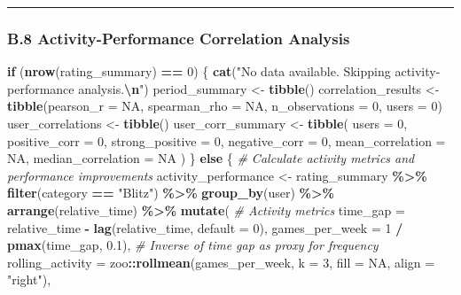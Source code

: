 \documentclass[
]{article}
\newenvironment{Shaded}{\begin{snugshade}}{\end{snugshade}}
\newcommand{\AttributeTok}[1]{\textcolor[rgb]{0.13,0.29,0.53}{#1}}
\newcommand{\CommentTok}[1]{\textcolor[rgb]{0.56,0.35,0.01}{\textit{#1}}}
\newcommand{\ConstantTok}[1]{\textcolor[rgb]{0.56,0.35,0.01}{#1}}
\newcommand{\ControlFlowTok}[1]{\textcolor[rgb]{0.13,0.29,0.53}{\textbf{#1}}}
\newcommand{\DecValTok}[1]{\textcolor[rgb]{0.00,0.00,0.81}{#1}}
\newcommand{\FloatTok}[1]{\textcolor[rgb]{0.00,0.00,0.81}{#1}}
\newcommand{\FunctionTok}[1]{\textcolor[rgb]{0.13,0.29,0.53}{\textbf{#1}}}
\newcommand{\NormalTok}[1]{#1}
\newcommand{\OtherTok}[1]{\textcolor[rgb]{0.56,0.35,0.01}{#1}}
\newcommand{\SpecialCharTok}[1]{\textcolor[rgb]{0.81,0.36,0.00}{\textbf{#1}}}
\newcommand{\StringTok}[1]{\textcolor[rgb]{0.31,0.60,0.02}{#1}}
\begin{document}
\begin{center}\rule{0.5\linewidth}{0.5pt}\end{center}

\subsubsection{B.8 Activity-Performance Correlation
Analysis}\label{b.8-activity-performance-correlation-analysis}

\begin{Shaded}
\begin{Highlighting}[]
\ControlFlowTok{if}\NormalTok{ (}\FunctionTok{nrow}\NormalTok{(rating\_summary) }\SpecialCharTok{==} \DecValTok{0}\NormalTok{) \{}
    \FunctionTok{cat}\NormalTok{(}\StringTok{"No data available. Skipping activity{-}performance analysis.}\SpecialCharTok{\textbackslash{}n}\StringTok{"}\NormalTok{)}
\NormalTok{    period\_summary }\OtherTok{\textless{}{-}} \FunctionTok{tibble}\NormalTok{()}
\NormalTok{    correlation\_results }\OtherTok{\textless{}{-}} \FunctionTok{tibble}\NormalTok{(}\AttributeTok{pearson\_r =} \ConstantTok{NA}\NormalTok{, }\AttributeTok{spearman\_rho =} \ConstantTok{NA}\NormalTok{, }\AttributeTok{n\_observations =} \DecValTok{0}\NormalTok{, }\AttributeTok{users =} \DecValTok{0}\NormalTok{)}
\NormalTok{    user\_correlations }\OtherTok{\textless{}{-}} \FunctionTok{tibble}\NormalTok{()}
\NormalTok{    user\_corr\_summary }\OtherTok{\textless{}{-}} \FunctionTok{tibble}\NormalTok{(}
        \AttributeTok{users =} \DecValTok{0}\NormalTok{, }\AttributeTok{positive\_corr =} \DecValTok{0}\NormalTok{, }\AttributeTok{strong\_positive =} \DecValTok{0}\NormalTok{,}
        \AttributeTok{negative\_corr =} \DecValTok{0}\NormalTok{, }\AttributeTok{mean\_correlation =} \ConstantTok{NA}\NormalTok{, }\AttributeTok{median\_correlation =} \ConstantTok{NA}
\NormalTok{    )}
\NormalTok{\} }\ControlFlowTok{else}\NormalTok{ \{}
    \CommentTok{\# Calculate activity metrics and performance improvements}
\NormalTok{    activity\_performance }\OtherTok{\textless{}{-}}\NormalTok{ rating\_summary }\SpecialCharTok{\%\textgreater{}\%}
        \FunctionTok{filter}\NormalTok{(category }\SpecialCharTok{==} \StringTok{"Blitz"}\NormalTok{) }\SpecialCharTok{\%\textgreater{}\%}
        \FunctionTok{group\_by}\NormalTok{(user) }\SpecialCharTok{\%\textgreater{}\%}
        \FunctionTok{arrange}\NormalTok{(relative\_time) }\SpecialCharTok{\%\textgreater{}\%}
        \FunctionTok{mutate}\NormalTok{(}
            \CommentTok{\# Activity metrics}
            \AttributeTok{time\_gap =}\NormalTok{ relative\_time }\SpecialCharTok{{-}} \FunctionTok{lag}\NormalTok{(relative\_time, }\AttributeTok{default =} \DecValTok{0}\NormalTok{),}
            \AttributeTok{games\_per\_week =} \DecValTok{1} \SpecialCharTok{/} \FunctionTok{pmax}\NormalTok{(time\_gap, }\FloatTok{0.1}\NormalTok{), }\CommentTok{\# Inverse of time gap as proxy for frequency}
            \AttributeTok{rolling\_activity =}\NormalTok{ zoo}\SpecialCharTok{::}\FunctionTok{rollmean}\NormalTok{(games\_per\_week, }\AttributeTok{k =} \DecValTok{3}\NormalTok{, }\AttributeTok{fill =} \ConstantTok{NA}\NormalTok{, }\AttributeTok{align =} \StringTok{"right"}\NormalTok{),}


\end{Highlighting}
\end{Shaded}
\end{document}
